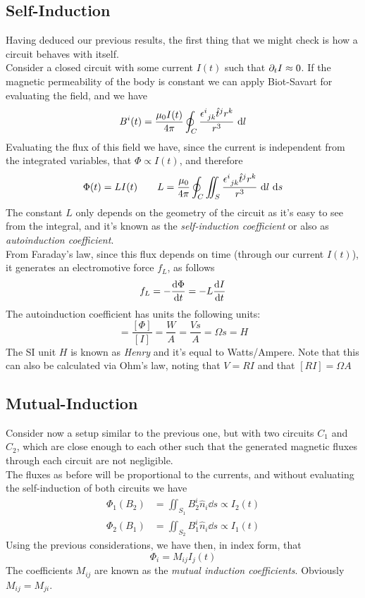 \documentclass[../electromagnetism]{subfiles}
\begin{document}
\subsection{Self-Induction}
Having deduced our previous results, the first thing that we might check is how a circuit behaves with itself.\\
Consider a closed circuit with some current $I(t)$ such that $\partial_tI\approx0$. If the magnetic permeability of the body is constant we can apply Biot-Savart for evaluating the field, and we have
\begin{equation}
    B^i(t)=\frac{\mu_0I(t)}{4\pi}\oint_C\frac{\epsilon^{i}_{\ jk}\hat{t}^jr^k}{r^3}\ \mathrm{d} l
    \label{eq:bsautoind}
\end{equation}
Evaluating the flux of this field we have, since the current is independent from the integrated variables, that $\Phi\propto I(t)$, and therefore
\begin{equation*}
	\Phi(t)=LI(t)\qquad L=\frac{\mu_0}{4\pi}\oint_C\iint_S\frac{\epsilon^{i}_{\ jk}\hat{t}^jr^k}{r^3}\ \mathrm{d} l\ \mathrm{d} s
\end{equation*}
The constant $L$ only depends on the geometry of the circuit as it's easy to see from the integral, and it's known as the \textit{self-induction coefficient} or also as \textit{autoinduction coefficient}.\\
From Faraday's law, since this flux depends on time (through our current $I(t)$), it generates an electromotive force $f_L$, as follows
\begin{equation}
	f_L=-\dv{\Phi}{t}=-L\dv{I}{t}
	\label{eq:emforce}
\end{equation}
The autoinduction coefficient has units the following units:
\begin{equation*}
	[L]=\frac{[\Phi]}{[I]}=\frac{W}{A}=\frac{Vs}{A}=\Omega s=H
\end{equation*}
The SI unit $H$ is known as \textit{Henry} and it's equal to Watts/Ampere. Note that this can also be calculated via Ohm's law, noting that $V=RI$ and that $[RI]=\Omega A$
\subsection{Mutual-Induction}
Consider now a setup similar to the previous one, but with two circuits $C_1$ and $C_2$, which are close enough to each other such that the generated magnetic fluxes through each circuit are not negligible.\\
The fluxes as before will be proportional to the currents, and without evaluating the self-induction of both circuits we have
\begin{equation}
	\begin{aligned}
		\Phi_1(B_2)&=\iint_{S_1}B_2^i\hat{n}_i\dd s\propto I_2(t)\\
		\Phi_2(B_1)&=\iint_{S_2}B_1^i\hat{n}_i\dd s\propto I_1(t)
	\end{aligned}
	\label{eq:fluxescircuitsmind}
\end{equation}
Using the previous considerations, we have then, in index form, that
\begin{equation}
	\Phi_i=M_{ij}I_j(t)
	\label{eq:mutualind}
\end{equation}
The coefficients $M_{ij}$ are known as the \textit{mutual induction coefficients}. Obviously $M_{ij}=M_{ji}$.
\end{document}
